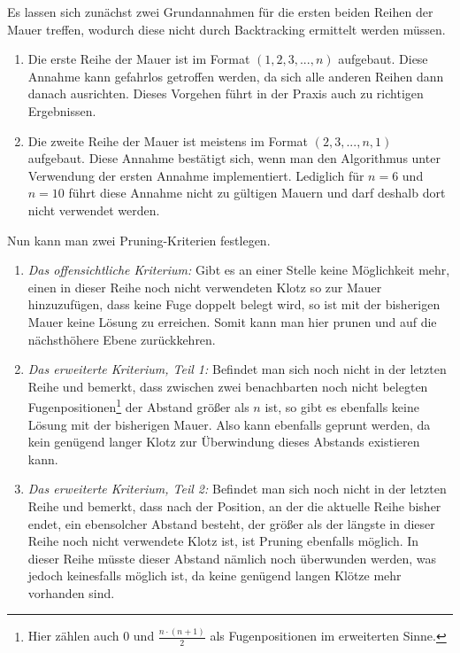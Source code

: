 \documentclass[a4paper, notitlepage, 12pt]{scrartcl}
\begin{document}
Es lassen sich zunächst zwei Grundannahmen für die ersten beiden Reihen der Mauer treffen, wodurch diese nicht durch Backtracking ermittelt werden müssen.
\begin{enumerate}
\item Die erste Reihe der Mauer ist im Format $(1,2,3,...,n)$ aufgebaut. Diese Annahme kann gefahrlos getroffen werden, da sich alle anderen Reihen dann danach ausrichten. Dieses Vorgehen führt in der Praxis auch zu richtigen Ergebnissen.
\item Die zweite Reihe der Mauer ist meistens im Format $(2,3,...,n,1)$ aufgebaut. Diese Annahme bestätigt sich, wenn man den Algorithmus unter Verwendung der ersten Annahme implementiert. Lediglich für $n = 6$ und $n = 10$ führt diese Annahme nicht zu gültigen Mauern und darf deshalb dort nicht verwendet werden.
\end{enumerate}
Nun kann man zwei Pruning-Kriterien festlegen.
\begin{enumerate}
\item \textit{Das offensichtliche Kriterium:} Gibt es an einer Stelle keine Möglichkeit mehr, einen in dieser Reihe noch nicht verwendeten Klotz so zur Mauer hinzuzufügen, dass keine Fuge doppelt belegt wird, so ist mit der bisherigen Mauer keine Lösung zu erreichen. Somit kann man hier prunen und auf die nächsthöhere Ebene zurückkehren.
\item \textit{Das erweiterte Kriterium, Teil 1:} Befindet man sich noch nicht in der letzten Reihe und bemerkt, dass zwischen zwei benachbarten noch nicht belegten Fugenpositionen\footnote{Hier zählen auch 0 und $\frac{n \cdot (n+1) }{2}$ als Fugenpositionen im erweiterten Sinne.} der Abstand größer als $n$ ist, so gibt es ebenfalls keine Lösung mit der bisherigen Mauer. Also kann ebenfalls geprunt werden, da kein genügend langer Klotz zur Überwindung dieses Abstands existieren kann.
\item \textit{Das erweiterte Kriterium, Teil 2:} Befindet man sich noch nicht in der letzten Reihe und bemerkt, dass nach der Position, an der die aktuelle Reihe bisher endet, ein ebensolcher Abstand besteht, der größer als der längste in dieser Reihe noch nicht verwendete Klotz ist, ist Pruning ebenfalls möglich. In dieser Reihe müsste dieser Abstand nämlich noch überwunden werden, was jedoch keinesfalls möglich ist, da keine genügend langen Klötze mehr vorhanden sind.
\end{enumerate}
\end{document}
